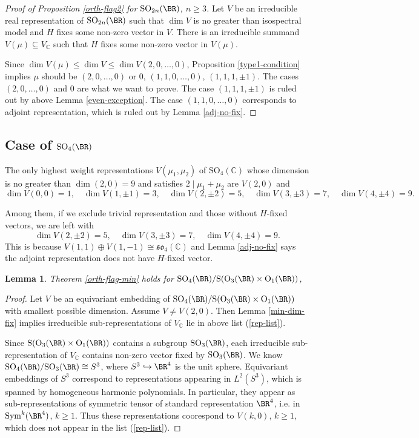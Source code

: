 \documentclass[a4paper]{amsart}
\newcommand{\BC}{{\mathbb {C}}} \newcommand{\BD}{{\mathbb {D}}}
\newcommand{\RO}{{\mathrm {O}}} \newcommand{\RP}{{\mathrm {P}}}
\newcommand{\RS}{{\mathrm {S}}} \newcommand{\RT}{{\mathrm {T}}}
\newcommand{\SO}{{\mathrm{SO}}}\newcommand{\so}{\mathfrak{so}}
\newcommand{\Sym}{{\mathrm{Sym}}}\newcommand{\sgn}{{\mathrm{sgn}}}
\newcommand{\incl}{\hookrightarrow}
\theoremstyle{plain}
\newtheorem{lem}[thm]{Lemma}
\theoremstyle{remark} \newtheorem{remark}[thm]{Remark}
\theoremstyle{remark} \newtheorem{exercise}{Exercise}
\theoremstyle{remark} \newtheorem{example}{Example}
\numberwithin{equation}{section}
\begin{document}
\begin{proof}[Proof of Proposition \ref{orth-flag2} for $\SO_{2n}(\BR)$, $n\geqslant 3$]
    Let $V$ be an irreducible real representation of $\SO_{2n}(\BR)$ such that $\dim V$ is no greater than isospectral model and $H$ fixes some non-zero vector in $V$. There is an irreducible summand $V(\mu)\subseteq V_\BC$ such that $H$ fixes some non-zero vector in $V(\mu)$. 
    
    Since $\dim V(\mu)\leqslant \dim V\leqslant\dim V(2,0,\ldots,0)$, Proposition \ref{type1-condition} implies $\mu$ should be $(2,0,\ldots,0)$ or $0$, $(1,1,0,\ldots,0)$, $(1,1,1,\pm 1)$. The cases $(2,0,\ldots,0)$ and $0$ are what we want to prove. The case $(1,1,1,\pm 1)$ is ruled out by above Lemma \ref{even-exception}. The case $(1,1,0,\ldots,0)$ corresponds to adjoint representation, which is ruled out by Lemma \ref{adj-no-fix}.
\end{proof}

\subsection{Case of $\SO_4(\BR)$}

The only highest weight representations $V(\mu_1,\mu_2)$ of $\SO_4(\BC)$ whose dimension is no greater than $\dim (2,0)=9$ and satisfies $2\mid \mu_1+\mu_2$ are $V(2,0)$ and
\[\dim V(0,0)=1,\quad \dim V(1,\pm1)=3,\quad\dim V(2,\pm 2)=5,\quad \dim V(3,\pm 3)=7,\quad\dim V(4,\pm 4)=9.\]

Among them, if we exclude trivial representation and those without $H$-fixed vectors, we are left with
\begin{equation}\label{rep-list}
\dim V(2,\pm 2)=5,\quad \dim V(3,\pm 3)=7,\quad\dim V(4,\pm 4)=9.
\end{equation}
This is because $V(1,1)\oplus V(1,-1)\cong\mathfrak{so}_4(\BC)$ and Lemma \ref{adj-no-fix} says the adjoint representation does not have $H$-fixed vector.

\begin{lem}
    Theorem \ref{orth-flag-min} holds for $\SO_4(\BR)/\RS(\RO_3(\BR)\times \RO_1(\BR))$, 
\end{lem}
\begin{proof}
    Let $V$ be an equivariant embedding of $\SO_4(\BR)/\RS(\RO_3(\BR)\times \RO_1(\BR))$ with smallest possible dimension. Assume $V\neq V(2,0)$. Then Lemma \ref{min-dim-fix} implies irreducible sub-representations of $V_\BC$ lie in above list (\ref{rep-list}).
    
    Since $\RS(\RO_3(\BR)\times \RO_1(\BR))$ contains a subgroup $\SO_3(\BR)$, each irreducible sub-representation of $V_\BC$ contains non-zero vector fixed by $\SO_3(\BR)$. We know $\SO_4(\BR)/\SO_3(\BR)\cong S^3$, where $S^3\incl\BR^4$ is the unit sphere. Equivariant embeddings of $S^3$ correspond to representations appearing in $L^2(S^3)$, which is spanned by homogeneous harmonic polynomials. In particular, they appear as sub-representations of symmetric tensor of standard representation $\BR^4$, i.e. in $\Sym^k(\BR^4)$, $k\geqslant 1$. Thus these representations coorespond to $V(k,0)$, $k\geqslant 1$, which does not appear in the list (\ref{rep-list}).
\end{proof}
\end{document}
